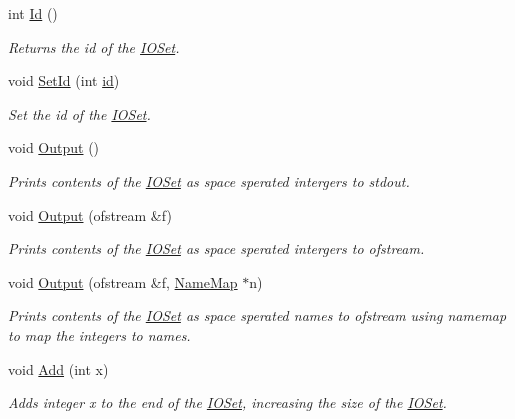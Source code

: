 \begin{DoxyCompactItemize}
int \hyperlink{class_i_o_set_aab9b694aacc43beacfcb4904478b9161}{Id} ()
\begin{DoxyCompactList}\small\item\em Returns the id of the \hyperlink{class_i_o_set}{IOSet}. \item\end{DoxyCompactList}\item 
void \hyperlink{class_i_o_set_a056e472b53a9a9bf83758ecae590d880}{SetId} (int \hyperlink{class_i_o_set_aec085771a7d9c730275ab9cf08e3feed}{id})
\begin{DoxyCompactList}\small\item\em Set the id of the \hyperlink{class_i_o_set}{IOSet}. \item\end{DoxyCompactList}\item 
void \hyperlink{class_i_o_set_a6dcbafab8dcc9533167e36078ac24e7e}{Output} ()
\begin{DoxyCompactList}\small\item\em Prints contents of the \hyperlink{class_i_o_set}{IOSet} as space sperated intergers to stdout. \item\end{DoxyCompactList}\item 
void \hyperlink{class_i_o_set_ae8a565049da3d6912e5da49af796d457}{Output} (ofstream \&f)
\begin{DoxyCompactList}\small\item\em Prints contents of the \hyperlink{class_i_o_set}{IOSet} as space sperated intergers to ofstream. \item\end{DoxyCompactList}\item 
void \hyperlink{class_i_o_set_a7c47a724e56e8502f8b0225c471d8592}{Output} (ofstream \&f, \hyperlink{class_name_map}{NameMap} $\ast$n)
\begin{DoxyCompactList}\small\item\em Prints contents of the \hyperlink{class_i_o_set}{IOSet} as space sperated names to ofstream using namemap to map the integers to names. \item\end{DoxyCompactList}\item 
void \hyperlink{class_i_o_set_ae9b008481e0f283e6c6d4ed99b91dc0e}{Add} (int x)
\begin{DoxyCompactList}\small\item\em Adds integer x to the end of the \hyperlink{class_i_o_set}{IOSet}, increasing the size of the \hyperlink{class_i_o_set}{IOSet}. \item\end{DoxyCompactList}\item 

\end{DoxyCompactItemize}
